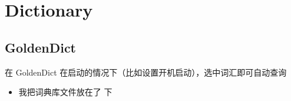 \chapter{Dictionary}


\section{GoldenDict}

 在 GoldenDict 在启动的情况下（比如设置开机启动），选中词汇即可自动查询

\begin{itemize}
\item 我把词典库文件放在了 下
\end{itemize}
